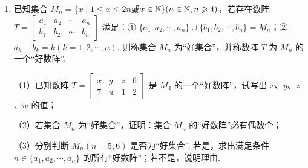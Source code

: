 \documentclass[a4paper,11pt]{article}
\begin{document}
\begin{enumerate}
\item 已知集合 $M_n=\{x\mid 1\leqslant x\leqslant 2n$或$x\in\mathbb{N}\}(n\in\mathbb{N},n\geqslant4)$，若存在数阵
$T=\begin{bmatrix}a_1&a_2&\cdots&a_n\\b_1&b_2&\cdots&b_n\end{bmatrix}$ 满足：① $\{a_1,a_2,\cdots,a_n\}\cup\{b_1,b_2,\cdots,b_n\}=M_n$；② $a_k-b_k=k(k=1,2,\cdots,n)$. 则称集合 $M_n$ 为“好集合”，并称数阵 $T$ 为 $M_n$ 的一个“好数阵”.%

（1）已知数阵 $T=\begin{bmatrix}x&y&z&6\\7&w&1&2\end{bmatrix}$ 是 $M_4$ 的一个“好数阵”，试写出 $x$、$y$、$z$、$w$ 的值；

（2）若集合 $M_n$ 为“好集合”，证明：集合 $M_n$ 的“好数阵”必有偶数个；

（3）分别判断 $M_n(n=5,6)$ 是否为“好集合”. 若是，求出满足条件 $n\in\{a_1,a_2,\cdots,a_n\}$ 的所有“好数阵”；若不是，说明理由.


\end{enumerate}
\end{document}
